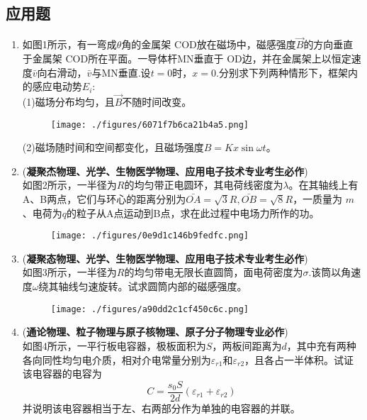 \subsection{应用题}
\begin{enumerate}
\item 如图1所示，有一弯成$\theta$角的金属架 COD放在磁场中，磁感强度$\vec B$的方向垂直于金属架 COD所在平面。一导体杆MN垂直于 OD边，并在金属架上以恒定速度$\bar v$向右滑动，$\bar v$与MN垂直.设$t=0$时，$x=0$.分别求下列两种情形下，框架内的感应电动势$E_i$:\\
(1)磁场分布均匀，且$\vec B$不随时间改变。\\
\begin{figure}[ht]
\centering
\texttt{[image: ./figures/6071f7b6ca21b4a5.png]}
\caption{} \label{fig_CD06_1}
\end{figure}
(2)磁场随时间和空间都变化，且磁场强度$B=Kx\sin \omega t$。
\item (\textbf{凝聚杰物理、光学、生物医学物理、应用电子技术专业考生必作})\\
如图2所示，一半径为$R$的均匀带正电圆环，其电荷线密度为$\lambda$。在其轴线上有A、B两点，它们与环心的距离分别为$\displaystyle \bar{OA}=\sqrt{3}R,\bar{OB}=\sqrt{8}R$，一质量为 $m$、电荷为$q$的粒子从A点运动到B点，求在此过程中电场力所作的功。
\begin{figure}[ht]
\centering
\texttt{[image: ./figures/0e9d1c146b9fedfc.png]}
\caption{} \label{fig_CD06_2}
\end{figure}
\item (\textbf{凝聚态物理、光学、生物医学物理、应用电子技术专业考生必作})\\
如图3所示，一半径为$R$的均匀带电无限长直圆筒，面电荷密度为$\sigma$.该筒以角速度$\omega$绕其轴线匀速旋转。试求圆筒内部的磁感强度。
\begin{figure}[ht]
\centering
\texttt{[image: ./figures/a90dd2c1cf450c6c.png]}
\caption{} \label{fig_CD06_3}
\end{figure}
\item (\textbf{通论物理、粒子物理与原子核物理、原子分子物理专业必作})\\
如图4所示，一平行板电容器，极板面积为$S$，两板间距离为$d$，其中充有两种各向同性均匀电介质，相对介电常量分别为$\varepsilon_{r1}$和$\varepsilon_{r2}$，且各占一半体积。试证该电容器的电容为\begin{equation}
C=\frac{s_0S}{2d}(\varepsilon_{r1}+\varepsilon_{r2})~
\end{equation}
并说明该电容器相当于左、右两部分作为单独的电容器的并联。
\begin{figure}[ht]

\end{figure}
\end{enumerate}
